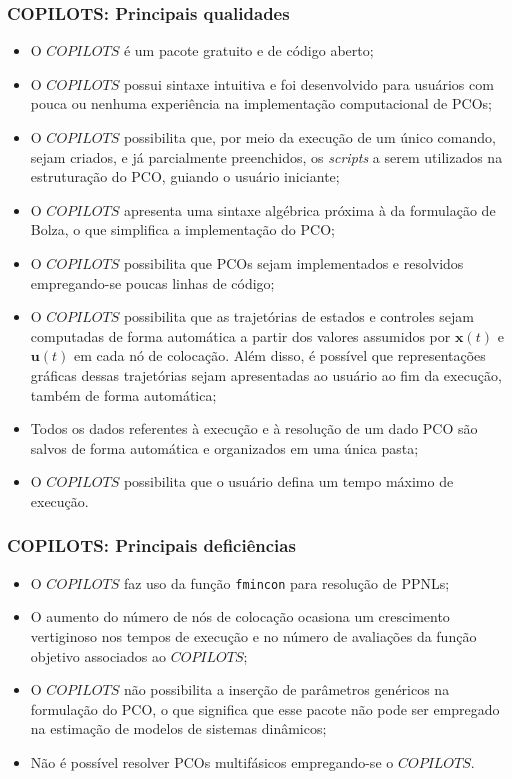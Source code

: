\subsubsection{COPILOTS: Principais qualidades}
\begin{itemize}
	\item O $COPILOTS$ é um pacote gratuito e de código aberto;
	
	\item O $COPILOTS$ possui sintaxe intuitiva e foi desenvolvido para usuários com pouca ou nenhuma experiência na implementação computacional de PCOs;
	
	\item O $COPILOTS$ possibilita que, por meio da execução de um único comando, sejam criados, e já parcialmente preenchidos, os \textit{scripts} a serem utilizados na estruturação do PCO, guiando o usuário iniciante;
	
	\item O $COPILOTS$ apresenta uma sintaxe algébrica próxima à da formulação de Bolza, o que simplifica a implementação do PCO;
	
	\item O $COPILOTS$ possibilita que PCOs sejam implementados e resolvidos empregando-se poucas linhas de código;
	
	\item O $COPILOTS$ possibilita que as trajetórias de estados e controles sejam computadas de forma automática a partir dos valores assumidos por $\mathbf{x}(t)$ e $\mathbf{u}(t)$ em cada nó de colocação. Além disso, é possível que representações gráficas dessas trajetórias sejam apresentadas ao usuário ao fim da execução, também de forma automática;
	
	\item Todos os dados referentes à execução e à resolução de um dado PCO são salvos de forma automática e organizados em uma única pasta;
	
	\item O $COPILOTS$ possibilita que o usuário defina um tempo máximo de execução.
\end{itemize}

\subsubsection{COPILOTS: Principais deficiências}
\begin{itemize}
	\item O $COPILOTS$ faz uso da função \texttt{fmincon} para resolução de PPNLs; 
	
	\item O aumento do número de nós de colocação ocasiona um crescimento vertiginoso nos tempos de execução e no número de avaliações da função objetivo associados ao $COPILOTS$; 
	
	\item O $COPILOTS$ não possibilita a inserção de parâmetros genéricos na formulação do PCO, o que significa que esse pacote não pode ser empregado na estimação de modelos de sistemas dinâmicos;
	
	\item Não é possível resolver PCOs multifásicos empregando-se o $COPILOTS$.
\end{itemize}